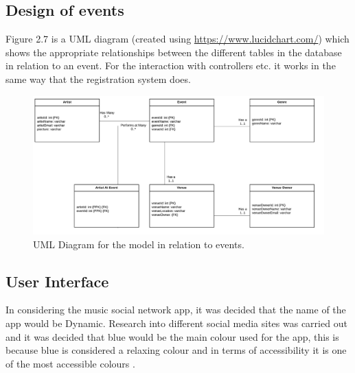 \subsection{Design of events}

Figure 2.7 is a UML diagram (created using \url{https://www.lucidchart.com/}) which shows the appropriate relationships between the different tables in the database in relation to an event. For the interaction with controllers etc. it works in the same way that the registration system does.
\begin{center}
\begin{figure}[H]
\includegraphics[width=\textwidth,height=\textheight,keepaspectratio]{images/events}
\caption{UML Diagram for the model in relation to events.}
\end{figure}
\end{center}


\subsection{User Interface}
In considering the music social network app, it was decided that the name of the app would be Dynamic. Research into different social media sites was carried out and it was decided that blue would be the main colour used for the app, this is because blue is considered a relaxing colour and in terms of accessibility it is one of the most accessible colours \cite{col}.
